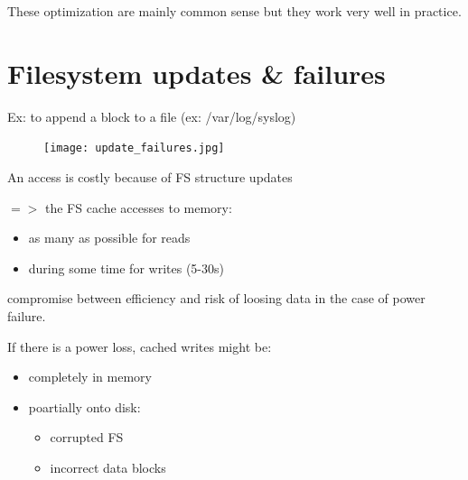These optimization are mainly common sense but they work very well in practice.

\section{Filesystem updates & failures}

Ex: to append a block to a file (ex: /var/log/syslog)

\begin{figure}[h!]
  \begin{center}
    \texttt{[image: update\_failures.jpg]}
  \end{center}
\end{figure}


An access is costly because of FS structure updates

$=>$ the FS cache accesses to memory:
\begin{itemize}
  \item as many as possible for reads
  \item during some time for writes (5-30s)
\end{itemize}
compromise between efficiency and risk of loosing data in the case of power failure.

If there is a power loss, cached writes might be:

\begin{itemize}
  \item completely in memory
  \item poartially onto disk:
    \begin{itemize}
      \item corrupted FS
      \item incorrect data blocks
    \end{itemize}
\end{itemize}

